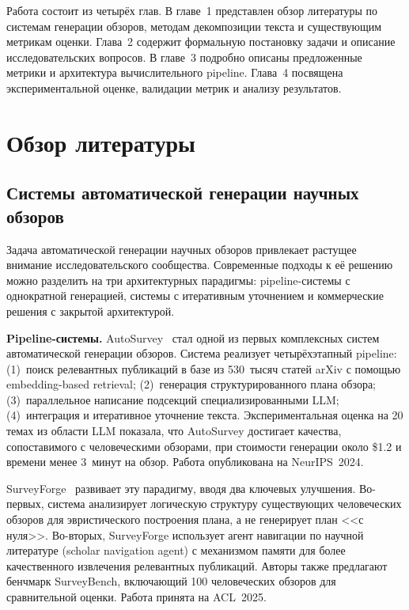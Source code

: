 \documentclass[a4paper,14pt]{extarticle}
\begin{document}
Работа состоит из четырёх глав. В главе~1 представлен обзор литературы по системам генерации обзоров, методам декомпозиции текста и существующим метрикам оценки. Глава~2 содержит формальную постановку задачи и описание исследовательских вопросов. В главе~3 подробно описаны предложенные метрики и архитектура вычислительного pipeline. Глава~4 посвящена экспериментальной оценке, валидации метрик и анализу результатов.

\newpage

\section{Обзор литературы}

\subsection{Системы автоматической генерации научных обзоров}

Задача автоматической генерации научных обзоров привлекает растущее внимание исследовательского сообщества. Современные подходы к её решению можно разделить на три архитектурных парадигмы: pipeline-системы с однократной генерацией, системы с итеративным уточнением и коммерческие решения с закрытой архитектурой.

\textbf{Pipeline-системы.} AutoSurvey~\cite{wang2024autosurvey} стал одной из первых комплексных систем автоматической генерации обзоров. Система реализует четырёхэтапный pipeline: (1)~поиск релевантных публикаций в базе из 530~тысяч статей arXiv с помощью embedding-based retrieval; (2)~генерация структурированного плана обзора; (3)~параллельное написание подсекций специализированными LLM; (4)~интеграция и итеративное уточнение текста. Экспериментальная оценка на 20 темах из области LLM показала, что AutoSurvey достигает качества, сопоставимого с человеческими обзорами, при стоимости генерации около \$1.2 и времени менее 3~минут на обзор. Работа опубликована на NeurIPS~2024.

SurveyForge~\cite{yan2025surveyforge} развивает эту парадигму, вводя два ключевых улучшения. Во-первых, система анализирует логическую структуру существующих человеческих обзоров для эвристического построения плана, а не генерирует план <<с нуля>>. Во-вторых, SurveyForge использует агент навигации по научной литературе (scholar navigation agent) с механизмом памяти для более качественного извлечения релевантных публикаций. Авторы также предлагают бенчмарк SurveyBench, включающий 100 человеческих обзоров для сравнительной оценки. Работа принята на ACL~2025.
\end{document}
